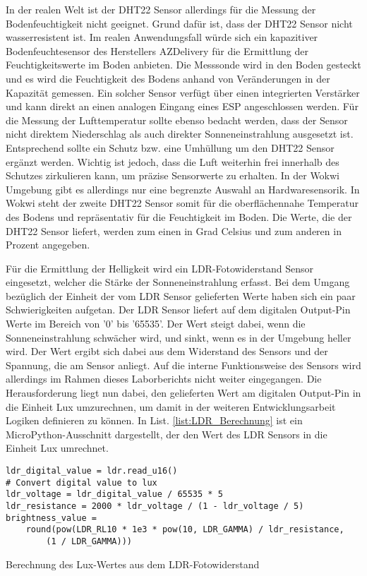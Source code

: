 In der realen Welt ist der DHT22 Sensor allerdings für die Messung der Bodenfeuchtigkeit nicht geeignet. Grund dafür ist, dass der DHT22 Sensor nicht wasserresistent ist. Im realen Anwendungsfall würde sich ein kapazitiver Bodenfeuchtesensor des Herstellers AZDelivery für die Ermittlung der Feuchtigkeitswerte im Boden anbieten. Die Messsonde wird in den Boden gesteckt und es wird die Feuchtigkeit des Bodens anhand von Veränderungen in der Kapazität gemessen. Ein solcher Sensor verfügt über einen integrierten Verstärker und kann direkt an einen analogen Eingang eines ESP angeschlossen werden. \newline
Für die Messung der Lufttemperatur sollte ebenso bedacht werden, dass der Sensor nicht direktem Niederschlag als auch direkter Sonneneinstrahlung ausgesetzt ist. Entsprechend sollte ein Schutz bzw. eine Umhüllung um den DHT22 Sensor ergänzt werden. Wichtig ist jedoch, dass die Luft weiterhin frei innerhalb des Schutzes zirkulieren kann, um präzise Sensorwerte zu erhalten.\newline
In der Wokwi Umgebung gibt es allerdings nur eine begrenzte Auswahl an Hardwaresensorik. In Wokwi steht der zweite DHT22 Sensor somit für die oberflächennahe Temperatur des Bodens und repräsentativ für die Feuchtigkeit im Boden. Die Werte, die der DHT22 Sensor liefert, werden zum einen in Grad Celsius und zum anderen in Prozent angegeben.

Für die Ermittlung der Helligkeit wird ein LDR-Fotowiderstand Sensor eingesetzt, welcher die Stärke der Sonneneinstrahlung erfasst. Bei dem Umgang bezüglich der Einheit der vom LDR Sensor gelieferten Werte haben sich ein paar Schwierigkeiten aufgetan. Der LDR Sensor liefert auf dem digitalen Output-Pin Werte im Bereich von '0' bis '65535'. Der Wert steigt dabei, wenn die Sonneneinstrahlung schwächer wird, und sinkt, wenn es in der Umgebung heller wird. Der Wert ergibt sich dabei aus dem Widerstand des Sensors und der Spannung, die am Sensor anliegt. Auf die interne Funktionsweise des Sensors wird allerdings im Rahmen dieses Laborberichts nicht weiter eingegangen. Die Herausforderung liegt nun dabei, den gelieferten Wert am digitalen Output-Pin in die Einheit Lux umzurechnen, um damit in der weiteren Entwicklungsarbeit Logiken definieren zu können. In List. \ref{list:LDR_Berechnung} ist ein MicroPython-Ausschnitt dargestellt, der den Wert des LDR Sensors in die Einheit Lux umrechnet.


\begin{listing}[!ht]
\begin{verbatim}
ldr_digital_value = ldr.read_u16()
# Convert digital value to lux
ldr_voltage = ldr_digital_value / 65535 * 5
ldr_resistance = 2000 * ldr_voltage / (1 - ldr_voltage / 5)
brightness_value = 
    round(pow(LDR_RL10 * 1e3 * pow(10, LDR_GAMMA) / ldr_resistance, 
        (1 / LDR_GAMMA)))
\end{verbatim}
\caption{Berechnung des Lux-Wertes aus dem LDR-Fotowiderstand}
\label{list:LDR_Berechnung}
\end{listing}
    

